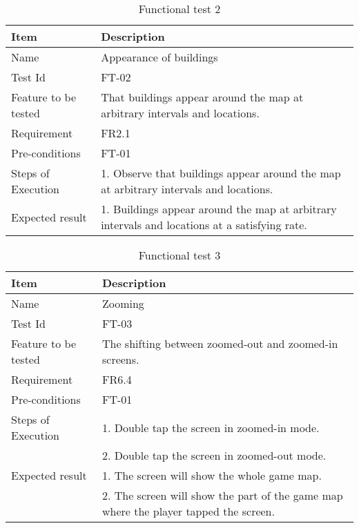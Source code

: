 \begin{table}[H]
\centering
	\begin{tabular}{ l | p{8cm} }
		\hline
		{\bf Item} & {\bf Description} \\ \hline
		Name & Appearance of buildings \\ 
		Test Id & FT-02 \\ 
		Feature to be tested & That buildings appear around the map at arbitrary intervals and locations. \\ 
		Requirement & FR2.1 \\ 
		Pre-conditions & FT-01 \\ 
		Steps of Execution & 1. Observe that buildings appear around the map at arbitrary intervals and locations.\\ 
		Expected result & 1. Buildings appear around the map at arbitrary intervals and locations at a satisfying rate.\\ 
	\end{tabular}
	\caption{Functional test 2}
\end{table}

\begin{table}[H]
\centering
	\begin{tabular}{ l | p{8cm} }
		\hline
		{\bf Item} & {\bf Description} \\ \hline
		Name & Zooming \\ 
		Test Id & FT-03 \\ 
		Feature to be tested & The shifting between zoomed-out and zoomed-in screens. \\ 
		Requirement & FR6.4 \\ 
		Pre-conditions & FT-01 \\ 
		Steps of Execution & 1. Double tap the screen in zoomed-in mode.\\ 
		& 2. Double tap the screen in zoomed-out mode. \\
		Expected result & 1. The screen will show the whole game map. \\
		& 2. The screen will show the part of the game map where the player tapped the screen. \\
	\end{tabular}
	\caption{Functional test 3}
\end{table}

